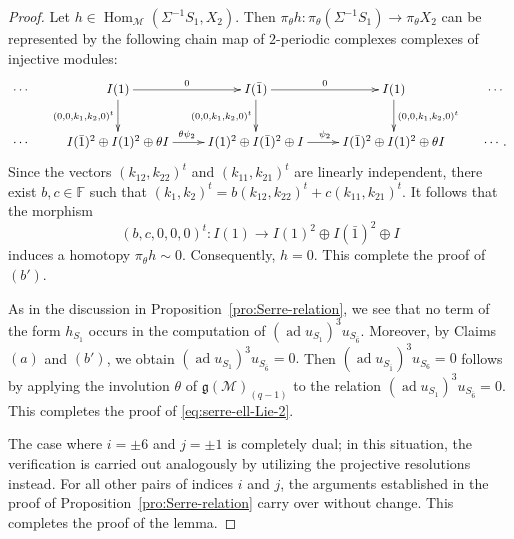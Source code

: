 \documentclass[12pt,reqno]{amsart}
\numberwithin{equation}{section}
\newcommand{\Hom}{\operatorname{Hom}\nolimits}
\begin{document}
\begin{proof}
		Let
		$h\in \Hom_{\mathcal M}(\Sigma^{-1}S_1,X_2)$.
		Then $\pi_\theta h: \pi_\theta(\Sigma^{-1}S_1)\rightarrow \pi_\theta X_2$ can be represented by the following chain map  of
		$2$-periodic complexes complexes of injective modules:
		\[
		\xymatrix{ 
			\cdots &
			{I(1)}\ar[d]_{(0,0,k_{1},k_{2},0)^t}\ar[r]^0 &  {I(\bar 1)} \ar[d]_{(0,0,k_{1},k_{2},0)^t}\ar[r]^0& {I(1)}\ar[d]^{(0,0,k_{1},k_{2},0)^t} &\cdots \\
			\cdots  &
			{I(\bar 1)^2\oplus I(1)^2\oplus \theta I} 
			\ar[r]^{
				\theta \psi_{2}
			} 
			& I(1)^2 \oplus  I(\bar 1)^2\oplus  I\ar[r]^{ \psi_2} &{I(\bar 1)^2 \oplus I(1)^2\oplus \theta I} & \cdots.
		}
		\]
		Since the vectors $(k_{12},k_{22})^t$ and $(k_{11},k_{21})^t$ are linearly independent, there exist $b,c\in\mathbb{F}$ such that
		$(k_1,k_2)^t=b(k_{12},k_{22})^t+c(k_{11},k_{21})^t.$
		It follows that the morphism
		\[
		(b,c,0,0,0)^t: I(1)\longrightarrow I(1)^2\oplus I(\bar 1)^2\oplus I
		\]
		induces a homotopy $\pi_\theta h\sim 0$. Consequently, $h=0$. This complete the proof of $(b')$.
		
		As in the discussion in Proposition~\ref{pro:Serre-relation}, we see that no term of the form $h_{S_1}$ occurs in the computation of
		$(\operatorname{ad}u_{S_1})^{3}u_{S_{\bar 6}}$. Moreover, by Claims $(a)$ and $(b')$, we obtain
		$(\operatorname{ad} u_{S_1})^3 u_{S_{\bar 6}}=0.$
		Then
		$(\operatorname{ad} u_{S_{\bar 1}})^3 u_{S_6}=0$
		follows by applying the involution $\theta$ of $\mathfrak{g}(\mathcal{M})_{(q-1)}$ to the relation
		$(\operatorname{ad} u_{S_1})^3 u_{S_{\bar 6}}=0.$
		This completes the proof of \eqref{eq:serre-ell-Lie-2}.
		
		The case where $i = \pm 6$ and $j = \pm 1$ is completely dual; in this situation, the verification is carried out analogously by utilizing the projective resolutions instead. For all other pairs of indices $i$ and $j$, the arguments established in the proof of Proposition~\ref{pro:Serre-relation} carry over without change. This completes the proof of the lemma.
	\end{proof}
	
	
	
\end{document}
